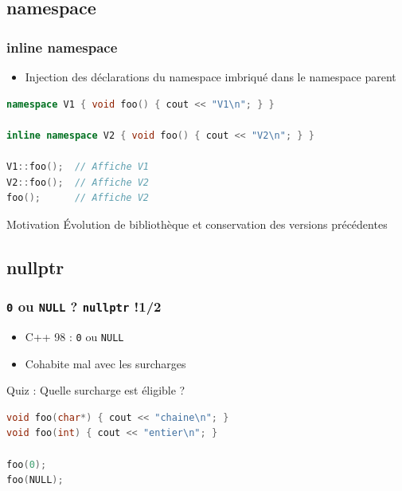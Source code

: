 \documentclass[C++.tex]{subfiles}
\begin{document}
\subsection*{namespace}
\begin{frame}[fragile]
	\frametitle{inline namespace}
	\begin{itemize}
		\item Injection des déclarations du namespace imbriqué dans le namespace parent
	\end{itemize}

	\begin{lstlisting}[language=C++]
namespace V1 { void foo() { cout << "V1\n"; } }

inline namespace V2 { void foo() { cout << "V2\n"; } }

V1::foo();  // Affiche V1
V2::foo();  // Affiche V2
foo();      // Affiche V2\end{lstlisting}

	\begin{block}{Motivation}
		Évolution de bibliothèque et conservation des versions précédentes
	\end{block}
\end{frame}

\subsection*{nullptr}
\begin{frame}[fragile]
	\frametitle{\lstinline|0| ou \lstinline|NULL| ? \lstinline|nullptr| !\titlehfill{}1/2}
	\begin{itemize}
		\item C++ 98 : \lstinline|0| ou \lstinline|NULL|


		\item Cohabite mal avec les surcharges
	\end{itemize}

	\begin{block}{Quiz : Quelle surcharge est éligible ?}
		\begin{lstlisting}[language=C++]
void foo(char*) { cout << "chaine\n"; }
void foo(int) { cout << "entier\n"; }

foo(0);
foo(NULL);\end{lstlisting}
	\end{block}


\end{frame}
\end{document}
